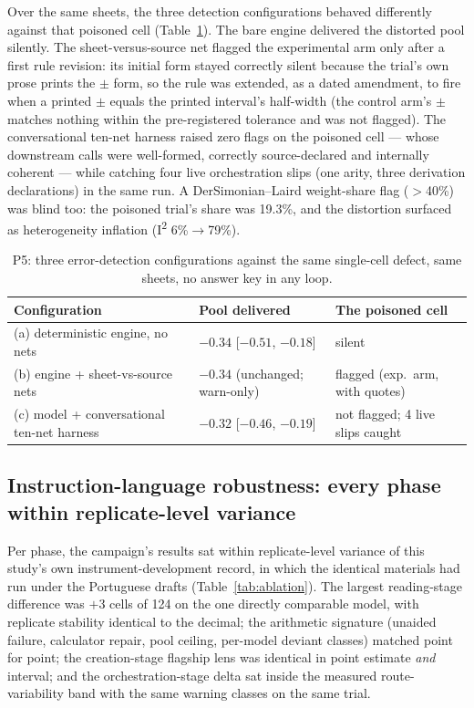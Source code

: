 \documentclass[11pt]{article}
\begin{document}
Over the same sheets, the three detection configurations behaved differently against that poisoned cell (Table~\ref{tab:configs}). The bare engine delivered the distorted pool silently. The sheet-versus-source net flagged the experimental arm only after a first rule revision: its initial form stayed correctly silent because the trial's own prose prints the $\pm$ form, so the rule was extended, as a dated amendment, to fire when a printed $\pm$ equals the printed interval's half-width (the control arm's $\pm$ matches nothing within the pre-registered tolerance and was not flagged). The conversational ten-net harness raised zero flags on the poisoned cell --- whose downstream calls were well-formed, correctly source-declared and internally coherent --- while catching four live orchestration slips (one arity, three derivation declarations) in the same run. A DerSimonian--Laird weight-share flag ($>$40\%) was blind too: the poisoned trial's share was 19.3\%, and the distortion surfaced as heterogeneity inflation (I\textsuperscript{2} 6\%$\rightarrow$79\%).

\begin{table}[H]
\centering\footnotesize
\caption{P5: three error-detection configurations against the same single-cell defect, same sheets, no answer key in any loop.}
\label{tab:configs}
\begin{tabular}{@{}p{5.1cm}p{4.1cm}p{4.7cm}@{}}
\toprule
Configuration & Pool delivered & The poisoned cell \\
\midrule
(a) deterministic engine, no nets & $-0.34$ [$-0.51$, $-0.18$] & silent \\
(b) engine + sheet-vs-source nets & $-0.34$ (unchanged; warn-only) & flagged (exp.\ arm, with quotes) \\
(c) model + conversational ten-net harness & $-0.32$ [$-0.46$, $-0.19$] & not flagged; 4 live slips caught \\
\bottomrule
\end{tabular}
\end{table}

\subsection{Instruction-language robustness: every phase within replicate-level variance}
Per phase, the campaign's results sat within replicate-level variance of this study's own instrument-development record, in which the identical materials had run under the Portuguese drafts (Table~\ref{tab:ablation}). The largest reading-stage difference was $+3$ cells of 124 on the one directly comparable model, with replicate stability identical to the decimal; the arithmetic signature (unaided failure, calculator repair, pool ceiling, per-model deviant classes) matched point for point; the creation-stage flagship lens was identical in point estimate \emph{and} interval; and the orchestration-stage delta sat inside the measured route-variability band with the same warning classes on the same trial.
\end{document}
